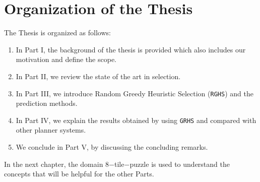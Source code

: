 \section{Organization of the Thesis}
\noindent
The Thesis is organized as follows: 
\begin{enumerate}
\item In Part I, the background of the thesis is provided which also includes our motivation and define the scope. 
\item In Part II, we review the state of the art in selection.
\item In Part III, we introduce Random Greedy Heuristic Selection (\texttt{RGHS}) and the prediction methods. 
\item In Part IV, we explain the results obtained by using \texttt{GRHS} and compared with other planner systems. 
\item We conclude in Part V, by discussing the concluding remarks.
\end{enumerate}

In the next chapter, the domain 8$-$tile$-$puzzle is used to understand the concepts that will be helpful for the other Parts. \\

\clearpage